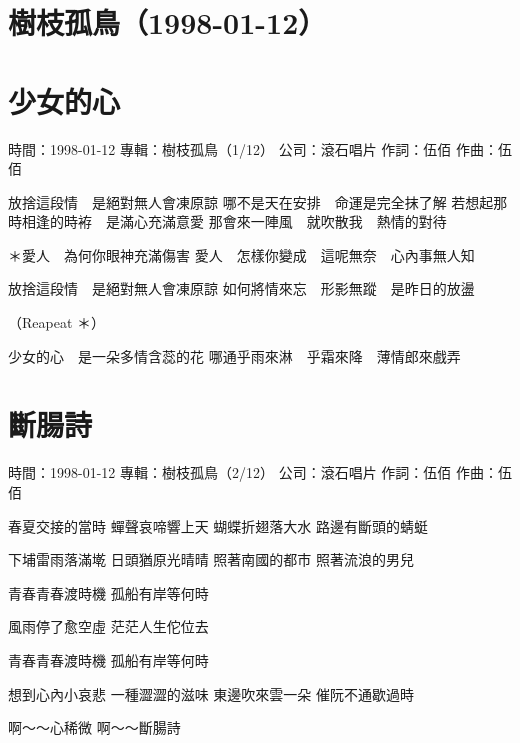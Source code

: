 \documentclass[UTF8,a4paper,oneside,twocolumn,12pt]{ctexbook}
\newcommand{\infopair}[2]{\textbullet #1：#2}
\newcommand{\zc}[1][伍佰]{\infopair{作詞}{#1}}
\newcommand{\zq}[1][伍佰]{\infopair{作曲}{#1}}
\newcommand{\zj}[1]{\infopair{專輯}{#1}}
\newcommand{\sj}[1]{\infopair{時間}{#1}}
\newcommand{\gs}[1]{\infopair{公司}{#1}}
\newenvironment{info}{\begin{flushleft}\kaishu
	}
	{\end{flushleft}\normalsize\yahei\par}
\newenvironment{lyric}{
	}
{}
\begin{document}
\section*{樹枝孤鳥（1998-01-12）}
\section{少女的心}
\begin{info}
	\sj{1998-01-12}
	\zj{樹枝孤鳥（1/12）}
	\gs{滾石唱片}
	\zc
	\zq
\end{info}
\begin{lyric}
	放捨這段情　是絕對無人會凍原諒
	哪不是天在安排　命運是完全抹了解
	若想起那時相逢的時袸　是滿心充滿意愛
	那會來一陣風　就吹散我　熱情的對待

	＊愛人　為何你眼神充滿傷害
	愛人　怎樣你變成　這呢無奈　心內事無人知

	放捨這段情　是絕對無人會凍原諒
	如何將情來忘　形影無蹤　是昨日的放盪

	（Reapeat ＊）

	少女的心　是一朵多情含蕊的花
	哪通乎雨來淋　乎霜來降　薄情郎來戲弄
\end{lyric}

\section{斷腸詩}
\begin{info}
	\sj{1998-01-12}
	\zj{樹枝孤鳥（2/12）}
	\gs{滾石唱片}
	\zc
	\zq
\end{info}
\begin{lyric}
	春夏交接的當時
	蟬聲哀啼響上天
	蝴蝶折翅落大水
	路邊有斷頭的蜻蜓

	下埔雷雨落滿墘
	日頭猶原光晴晴
	照著南國的都市
	照著流浪的男兒

	青春青春渡時機
	孤船有岸等何時

	風雨停了愈空虛
	茫茫人生佗位去

	青春青春渡時機
	孤船有岸等何時

	想到心內小哀悲
	一種澀澀的滋味
	東邊吹來雲一朵
	催阮不通歇過時

	啊～～心稀微
	啊～～斷腸詩
\end{lyric}
\end{document}
